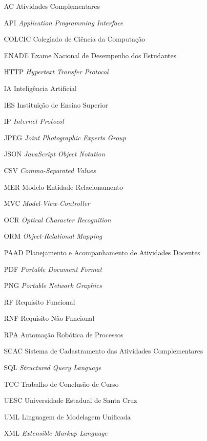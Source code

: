 \begin{siglas}

    \item[AC] Atividades Complementares
    \item[API] \textit{Application Programming Interface}
    \item[COLCIC] Colegiado de Ciência da Computação
    \item[ENADE] Exame Nacional de Desempenho dos Estudantes
    \item[HTTP] \textit{Hypertext Transfer Protocol}
    \item[IA] Inteligência Artificial
    \item[IES] Instituição de Ensino Superior
    \item[IP] \textit{Internet Protocol}
    \item[JPEG] \textit{Joint Photographic Experts Group}
    \item[JSON] \textit{JavaScript Object Notation}
    \item[CSV] \textit{Comma-Separated Values}
    \item[MER] Modelo Entidade-Relacionamento
    \item[MVC] \textit{Model-View-Controller}
    \item[OCR] \textit{Optical Character Recognition}
    \item[ORM] \textit{Object-Relational Mapping}
    \item[PAAD] Planejamento e Acompanhamento de Atividades Docentes
    \item[PDF] \textit{Portable Document Format}
    \item[PNG] \textit{Portable Network Graphics}
    \item[RF] Requisito Funcional
    \item[RNF] Requisito Não Funcional
    \item[RPA] Automação Robótica de Processos
    \item[SCAC] Sistema de Cadastramento das Atividades Complementares
    \item[SQL] \textit{Structured Query Language}
    \item[TCC] Trabalho de Conclusão de Curso
    \item[UESC] Universidade Estadual de Santa Cruz
    \item[UML] Linguagem de Modelagem Unificada
    \item[XML] \textit{Extensible Markup Language}

\end{siglas}







